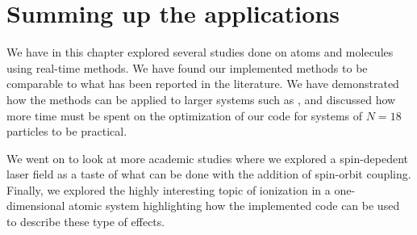     \section{Summing up the applications}
        We have in this chapter explored several studies done on atoms and
        molecules using real-time methods.
        We have found our implemented methods to be comparable to what has been
        reported in the literature.
        We have demonstrated how the methods can be applied to larger systems
        such as , and discussed how more time must be spent on the
        optimization of our code for systems of $N = 18$ particles to be
        practical.

        We went on to look at more academic studies where we explored a
        spin-depedent laser field as a taste of what can be done with the
        addition of spin-orbit coupling.
        Finally, we explored the highly interesting topic of ionization in a
        one-dimensional atomic system highlighting how the implemented code can
        be used to describe these type of effects.


\clearemptydoublepage
